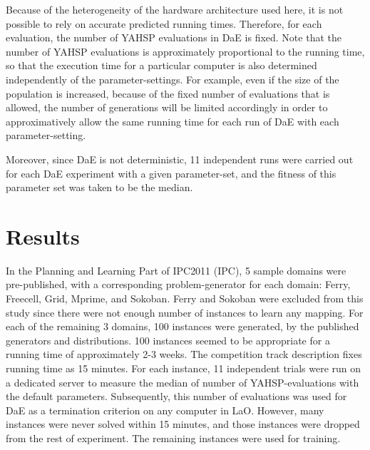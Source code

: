\documentclass{MYsig-alternate}
\begin{document}
Because of the heterogeneity of the hardware architecture used here, it is not possible to rely on accurate predicted running times. Therefore, for each evaluation, the number of YAHSP evaluations in DaE is fixed. Note that the number of YAHSP evaluations is approximately proportional to the running time, so that the execution time for a particular computer is also determined independently of the parameter-settings. For example, even if the size of the population is increased, because of the fixed number of evaluations that is allowed, the number of generations will be limited accordingly in order to approximatively allow the same running time for each run of DaE with each parameter-setting. 


Moreover, since DaE is not deterministic, 11 independent runs were carried out for each DaE experiment with a given parameter-set, and the fitness of this parameter set was taken to be the median.

\section{Results}
\label{section:results}

In the Planning and Learning Part of IPC2011 (IPC), 5 sample domains were pre-published, with a corresponding problem-generator for each domain: Ferry, Freecell, Grid, Mprime, and Sokoban. Ferry and Sokoban were excluded from this study since there were not enough number of instances to learn any mapping. For each of the remaining 3 domains, 100 instances were generated, by the published generators and distributions. 100 instances seemed to be appropriate for a running time of approximately 2-3 weeks. The competition track description fixes running time as 15 minutes. For each instance, 11 independent trials were run on a dedicated server to measure the median of number of YAHSP-evaluations with the default parameters. Subsequently, this number of evaluations was used for DaE as a termination criterion on any computer in LaO. However, many instances were never solved within 15 minutes, and those instances were dropped from the rest of experiment. The remaining instances were used for training.
\end{document}
